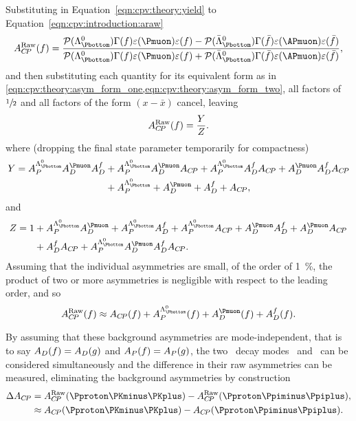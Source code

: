Substituting in Equation~\ref{eqn:cpv:theory:yield} to 
Equation~\ref{eqn:cpv:introduction:araw}
\begin{equation*}
  \ARaw(f) = \frac{%
    \prob(\PLambdab)\Gamma(f)\eff(\Pmuon)\eff(f) - 
    \prob(\APLambdab)\Gamma(\bar{f})\eff(\APmuon)\eff(\bar{f})
  }{%
    \prob(\PLambdab)\Gamma(f)\eff(\Pmuon)\eff(f) + 
    \prob(\APLambdab)\Gamma(\bar{f})\eff(\APmuon)\eff(\bar{f})
  },
\end{equation*}
and then substituting each quantity for its equivalent form as in 
\cref{eqn:cpv:theory:asym_form_one,eqn:cpv:theory:asym_form_two}, all factors 
of $\sfrac{1}{2}$ and all factors of the form $(x - \bar{x})$ cancel, leaving
\begin{equation}
A_{C\!P}^{\textnormal{Raw}}(f) = \frac{Y}{Z}.
\end{equation}
where (dropping the final state parameter temporarily for compactness)
\begin{align}
Y = \APLb\ADmu\ADf &+ \APLb\ADmu\ACP + \APLb\ADf\ACP + \ADmu\ADf\ACP \nonumber\\
                   &+ \APLb +  \ADmu + \ADf + \ACP,
\end{align}
and
\begin{align}
Z = 1 &+ \APLb\ADmu + \APLb\ADf + \APLb\ACP + \ADmu\ADf + \ADmu\ACP \nonumber\\
      &+ \ADf\ACP + \APLb\ADmu\ADf\ACP.
\end{align}
Assuming that the individual asymmetries are small, of the order of 
\SI{1}{\percent}, the product of two or more asymmetries is negligible with 
respect to the leading order, and so
\begin{equation}
  \ARaw(f) \approx \ACP(f) + \APLb(f) + \ADmu(f) + \ADf(f).
  \label{eqn:cpv:theory:araw_approx}
\end{equation}

By assuming that these background asymmetries are mode-independent, that is to 
say $A_{D}(f) = A_{D}(g)$ and $A_{P}(f) = A_{P}(g)$, the two \PLambdac\ decay modes 
\pKK\ and \ppipi\ can be considered simultaneously and the difference in their 
raw asymmetries can be measured, eliminating the background asymmetries by 
construction
\begin{align}
  \dACP &= \ARaw(\pKK) - \ARaw(\ppipi),\label{eqn:cpv:theory:dacp}\\
        &\approx \ACP(\pKK) - \ACP(\ppipi)\nonumber.
\end{align}

